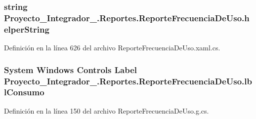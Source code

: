 \hypertarget{class_proyecto___integrador__3_1_1_reportes_1_1_reporte_frecuencia_de_uso_a445e3fd272881069a4fb7c71982c185b}{
\subsubsection[{helper\-String}]{\setlength{\rightskip}{0pt plus 5cm}string Proyecto\-\_\-\-Integrador\-\_.\-Reportes.\-Reporte\-Frecuencia\-De\-Uso.\-helper\-String\hspace{0.3cm}{\ttfamily [private]}}}\label{class_proyecto___integrador__3_1_1_reportes_1_1_reporte_frecuencia_de_uso_a445e3fd272881069a4fb7c71982c185b}


Definición en la línea 626 del archivo Reporte\-Frecuencia\-De\-Uso.\-xaml.\-cs.

\hypertarget{class_proyecto___integrador__3_1_1_reportes_1_1_reporte_frecuencia_de_uso_aad6d42ec1def08d2c9851f5952be9428}{
\subsubsection[{lbl\-Consumo}]{\setlength{\rightskip}{0pt plus 5cm}System Windows Controls Label Proyecto\-\_\-\-Integrador\-\_.\-Reportes.\-Reporte\-Frecuencia\-De\-Uso.\-lbl\-Consumo\hspace{0.3cm}{\ttfamily [package]}}}\label{class_proyecto___integrador__3_1_1_reportes_1_1_reporte_frecuencia_de_uso_aad6d42ec1def08d2c9851f5952be9428}


Definición en la línea 150 del archivo Reporte\-Frecuencia\-De\-Uso.\-g.\-cs.

